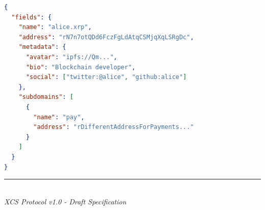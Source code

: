 \documentclass[11pt,a4paper]{article}
\begin{document}
\begin{lstlisting}[language=json]
{
  "fields": {
    "name": "alice.xrp",
    "address": "rN7n7otQDd6FczFgLdAtqCSMjqXqLSRgDc",
    "metadata": {
      "avatar": "ipfs://Qm...",
      "bio": "Blockchain developer",
      "social": ["twitter:@alice", "github:alice"]
    },
    "subdomains": [
      {
        "name": "pay",
        "address": "rDifferentAddressForPayments..."
      }
    ]
  }
}
\end{lstlisting}

\vspace{2cm}
\begin{center}
\rule{0.5\textwidth}{0.4pt}\\[0.5cm]
\textit{XCS Protocol v1.0 - Draft Specification}
\end{center}
\end{document}
